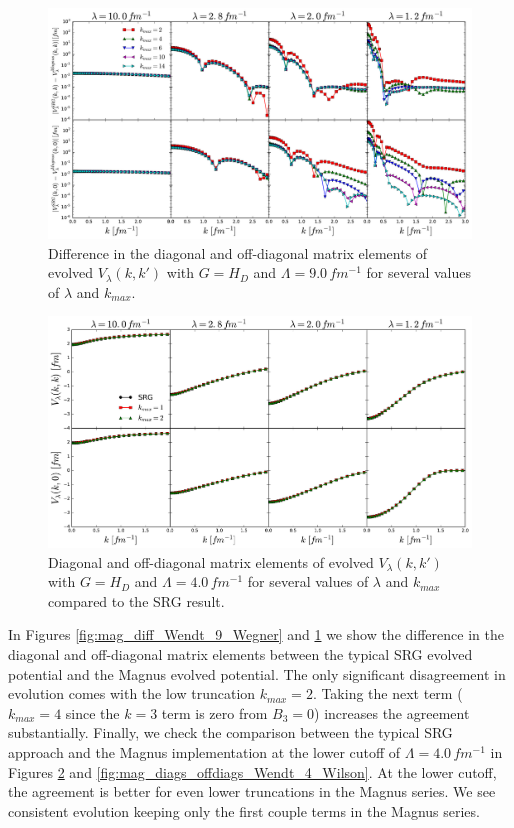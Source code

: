\documentclass[preprintnumbers,floatfix,aps,prc,preprint]{revtex4-1}
\begin{document}
\begin{figure}[H]
  \centering
  \includegraphics[width=15cm]{mag_diff_Wendt_9_Wilson}
   \hspace*{0.05\textwidth}%
  \caption{Difference in the diagonal and off-diagonal matrix elements of evolved $V_{\lambda}(k,k')$ with $G=H_D$ and $\Lambda=9.0 \, fm^{-1}$ for several values of $\lambda$ and $k_{max}$.}
  \label{fig:mag_diff_Wendt_9_Wilson}
\end{figure}
%
\begin{figure}[H]
  \centering
  \includegraphics[width=15cm]{mag_diags_offdiags_Wendt_4_Wegner}
   \hspace*{0.05\textwidth}%
  \caption{Diagonal and off-diagonal matrix elements of evolved $V_{\lambda}(k,k')$ with $G=H_{D}$ and $\Lambda=4.0 \, fm^{-1}$ for several values of $\lambda$ and $k_{max}$ compared to the SRG result.}
  \label{fig:mag_diags_offdiags_Wendt_4_Wegner}
\end{figure}
%
In Figures \ref{fig:mag_diff_Wendt_9_Wegner} and \ref{fig:mag_diff_Wendt_9_Wilson} we show the difference in the diagonal and off-diagonal matrix elements between the typical SRG evolved potential and the Magnus evolved potential. The only significant disagreement in evolution comes with the low truncation $k_{max}=2$. Taking the next term ($k_{max}=4$ since the $k=3$ term is zero from $B_3=0$) increases the agreement substantially. Finally, we check the comparison between the typical SRG approach and the Magnus implementation at the lower cutoff of $\Lambda=4.0 \, fm^{-1}$ in Figures \ref{fig:mag_diags_offdiags_Wendt_4_Wegner} and \ref{fig:mag_diags_offdiags_Wendt_4_Wilson}. At the lower cutoff, the agreement is better for even lower truncations in the Magnus series. We see consistent evolution keeping only the first couple terms in the Magnus series.
\end{document}
